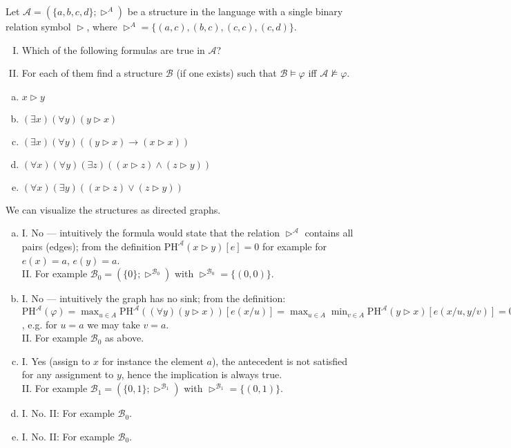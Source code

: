 \begin{problem}

    Let $\mathcal{A}=(\{a,b,c,d\};\vartriangleright^{A})$ be a structure in the language with a single binary relation symbol $\vartriangleright$, where $\vartriangleright^{A}=\{(a,c), (b,c), (c,c), (c,d)\}$. 
    \begin{enumerate}[I.]
        \item Which of the following formulas are true in $\mathcal A$? 
        \item For each of them find a structure $\mathcal{B}$ (if one exists) such that $\mathcal{B}\models \varphi$ iff $\mathcal{A}\not\models \varphi$.
    \end{enumerate}    
    \begin{enumerate}[(a)]
       \item $x \vartriangleright y$
       \item $(\exists x)(\forall y)(y \vartriangleright x)$
       \item $(\exists x)(\forall y)((y \vartriangleright x) \to (x \vartriangleright x))$
       \item $(\forall x)(\forall y)(\exists z)((x \vartriangleright z)\wedge(z \vartriangleright y))$
       \item $(\forall x)(\exists y)((x \vartriangleright z)\vee(z \vartriangleright y))$
    \end{enumerate}

    \begin{solution}

        We can visualize the structures as directed graphs.
        \begin{enumerate}[(a)]
            \item I. No --- intuitively the formula would state that the relation $\vartriangleright^\mathcal A$ contains all pairs (edges); from the definition $\mathrm{PH}^\mathcal A(x \vartriangleright y)[e]=0$ for example for $e(x)=a$, $e(y)=a$.\\            
            II. For example $\mathcal B_0=(\{0\};\vartriangleright^{\mathcal B_0})$ with $\vartriangleright^{\mathcal B_0}=\{(0,0)\}$.
            \item I. No --- intuitively the graph has no sink; from the definition: $\mathrm{PH}^\mathcal A(\varphi)=\max_{u\in A}\mathrm{PH}^\mathcal A((\forall y)(y \vartriangleright x))[e(x/u)]=\max_{u\in A}\min_{v\in A}\mathrm{PH}^\mathcal A(y \vartriangleright x)[e(x/u,y/v)]=0$, e.g. for $u=a$ we may take $v=a$.\\
            II. For example $\mathcal B_0$ as above.
            \item I. Yes (assign to $x$ for instance the element $a$), the antecedent is not satisfied for any assignment to $y$, hence the implication is always true.\\
            II. For example $\mathcal B_1=(\{0,1\};\vartriangleright^{\mathcal B_1})$ with $\vartriangleright^{\mathcal B_1}=\{(0,1)\}$.
            \item I. No. II: For example $\mathcal B_0$.
            \item I. No. II: For example $\mathcal B_0$.  
        \end{enumerate}
        

\end{solution}
\end{problem}
